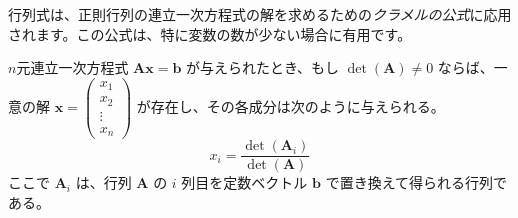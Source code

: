 行列式は、正則行列の連立一次方程式の解を求めるための\emph{クラメルの公式}に応用されます。この公式は、特に変数の数が少ない場合に有用です。

\begin{thm}[クラメルの公式]
$n$元連立一次方程式 $\bm{A}\bm{x} = \bm{b}$ が与えられたとき、もし $\det(\bm{A}) \neq 0$ ならば、一意の解 $\bm{x} = \begin{pmatrix} x_1 \\ x_2 \\ \vdots \\ x_n \end{pmatrix}$ が存在し、その各成分は次のように与えられる。
\[ x_i = \frac{\det(\bm{A}_i)}{\det(\bm{A})} \]
ここで $\bm{A}_i$ は、行列 $\bm{A}$ の $i$ 列目を定数ベクトル $\bm{b}$ で置き換えて得られる行列である。
\end{thm}

